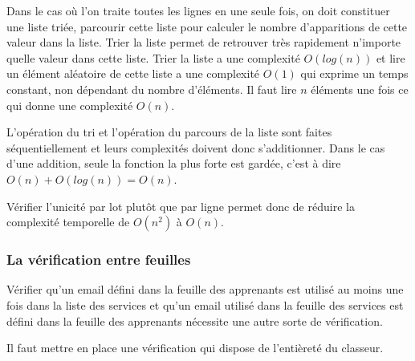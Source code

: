 Dans le cas où l'on traite toutes les lignes en une seule fois, on doit constituer une liste triée, parcourir cette liste pour calculer le nombre d'apparitions de cette valeur dans la liste.
Trier la liste permet de retrouver très rapidement n'importe quelle valeur dans cette liste.
Trier la liste a une complexité $O(log(n))$ et lire un élément aléatoire de cette liste a une complexité $O(1)$ qui exprime un temps constant, non dépendant du nombre d'éléments.
Il faut lire $n$ éléments une fois ce qui donne une complexité $O(n)$.

L'opération du tri et l'opération du parcours de la liste sont faites séquentiellement et leurs complexités doivent donc s'additionner.
Dans le cas d'une addition, seule la fonction la plus forte est gardée, c'est à dire $O(n) + O(log(n)) = O(n)$.

Vérifier l'unicité par lot plutôt que par ligne permet donc de réduire la complexité temporelle de $O(n^2)$ à $O(n)$.

\subsubsection{La vérification entre feuilles}
Vérifier qu'un email défini dans la feuille des apprenants est utilisé au moins une fois dans la liste des services et qu'un email utilisé dans la feuille des services est défini dans la feuille des apprenants nécessite une autre sorte de vérification.

Il faut mettre en place une vérification qui dispose de l'entièreté du classeur.

